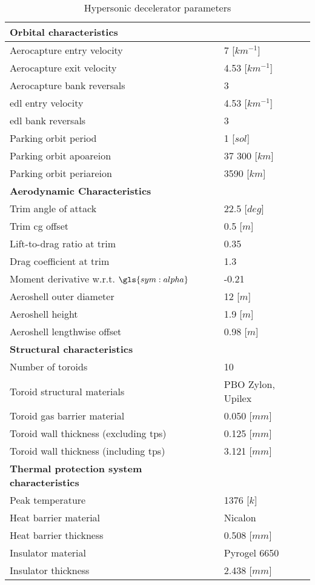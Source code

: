 \begin{table}[H]
	\centering
	\caption{Hypersonic decelerator parameters}
	\label{tab:DeceleratorPar}
	\begin{tabular}{|p{}|p{}|} \hline
		\textbf{Orbital characteristics}             	& 			\\ \hline \hline
		Aerocapture entry velocity       				&	 7 [$km^{-1}$] 		\\ \hline
		Aerocapture exit velocity				 		&    4.53 [$km^{-1}$]  	  	\\ \hline
		Aerocapture bank reversals				        &  	 3 		\\ \hline
		\gls{edl} entry velocity					 	&  	 4.53 [$km^{-1}$]	\\ \hline
		\gls{edl} bank reversals					 	&  	 3	\\ \hline
		Parking orbit period						 	&  	 1 [$sol$]		\\ \hline
		Parking orbit apoareion			 				&  	37 300 [$km$]		\\ \hline
		Parking orbit periareion			 			&  	3590 [$km$]		\\ \hline
		\textbf{Aerodynamic Characteristics}			&			\\ \hline \hline
		Trim angle of attack				 			&  22.5 [$deg$]			\\ \hline
		Trim \gls{cg} offset							&  0.5 [$m$]		\\ \hline
		Lift-to-drag ratio at trim			 			&  	0.35	\\ \hline
		Drag coefficient at trim			 			&  	1.3	\\ \hline
		Moment derivative w.r.t. $\gls{sym:alpha}$		&  	-0.21		\\ \hline
		Aeroshell outer diameter						&  	12 [$m$]		\\ \hline
		Aeroshell height								&  	1.9 [$m$]		\\ \hline
		Aeroshell lengthwise offset						&  	0.98 [$m$]		\\ \hline
		\textbf{Structural characteristics}				&			\\ \hline \hline
		Number of toroids					 			&   10			\\ \hline 
		Toroid structural materials						 			&  	PBO Zylon\textsuperscript{\textregistered}, Upilex		\\ \hline
		Toroid gas barrier material		&	0.050 [$mm$]		\\ \hline
		Toroid wall thickness (excluding \gls{tps})		&	0.125 [$mm$]		\\ \hline
		Toroid wall thickness (including \gls{tps})		&	3.121 [$mm$]		\\ \hline
		\textbf{Thermal protection system characteristics}	&		\\ \hline \hline
		Peak temperature							&	 1376 [$k$]		\\ \hline
		Heat barrier material							&	Nicalon		\\ \hline
		Heat barrier thickness							&	0.508 [$mm$]		\\ \hline
		Insulator material								&	Pyrogel\textsuperscript{\textregistered} 6650		\\ \hline
		Insulator thickness								&	2.438 [$mm$]		\\ \hline
			

\end{tabular}
\end{table}
